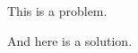 \documentclass{homework}
\begin{document}
\begin{problem}
This is a problem.
\end{problem}
\begin{solution}
And here is a solution.
\end{solution}
\end{document}
